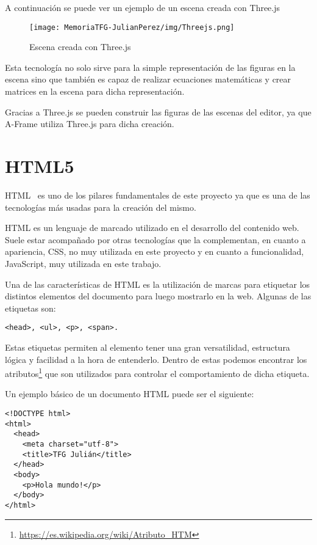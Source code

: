 \documentclass[a4paper, 12pt]{book}
\begin{document}
A continuación se puede ver un ejemplo de un escena creada con Three.js
\begin{figure}[H]
  \centering
  \texttt{[image: MemoriaTFG-JulianPerez/img/Threejs.png]}
  \caption{Escena creada con Three.js}\label{fig:three}
\end{figure}

Esta tecnología no solo sirve para la simple representación de las figuras en la escena sino que también es capaz de realizar ecuaciones matemáticas y crear matrices en la escena para dicha representación.

Gracias a Three.js se pueden construir las figuras de las escenas del editor, ya que A-Frame utiliza Three.js para dicha creación.

\section{HTML5} %
\label{sec:HTML5}
HTML~\cite{HTML} es uno de los pilares fundamentales de este proyecto ya que es una de las tecnologías más usadas para la creación del mismo.

HTML es un lenguaje de marcado utilizado en el desarrollo del contenido web. Suele estar acompañado por otras tecnologías que la complementan, en cuanto a apariencia, CSS, no muy utilizada en este proyecto y en cuanto a funcionalidad, JavaScript, muy utilizada en este trabajo.

Una de las características de HTML es la utilización de marcas para etiquetar los distintos elementos del documento para luego mostrarlo en la web. Algunas de las etiquetas son: \begin{verbatim}<head>, <ul>, <p>, <span>.\end{verbatim} 

Estas etiquetas permiten al elemento tener una gran versatilidad, estructura lógica y facilidad a la hora de entenderlo. Dentro de estas podemos encontrar los atributos\footnote{\url{https://es.wikipedia.org/wiki/Atributo_HTM}} que son utilizados para controlar el comportamiento de dicha etiqueta.

Un ejemplo básico de un documento HTML puede ser el siguiente:

\begin{verbatim}
<!DOCTYPE html>
<html>
  <head>
    <meta charset="utf-8">
    <title>TFG Julián</title>
  </head>
  <body>
    <p>Hola mundo!</p>
  </body>
</html>
\end{verbatim}
\end{document}
